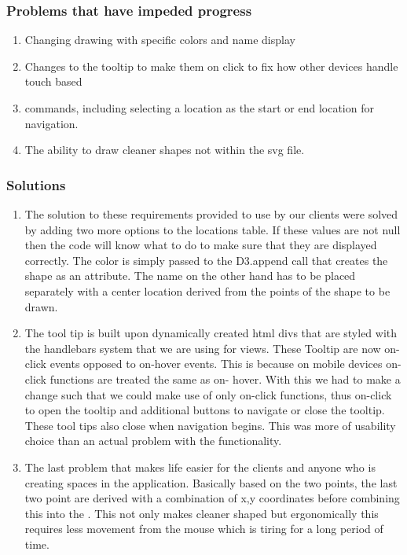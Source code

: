 \documentclass[letterpaper,10pt,serif,titlepage, onecolumn, compsoc]{IEEEtran}
\begin{document}
\subsubsection{Problems that have impeded progress}
\begin{enumerate}
\item Changing drawing with specific colors and name display
\item Changes to the tooltip to make them on click to fix how other devices handle touch based \item 	commands, including selecting a location as the start or end location for navigation.
\item The ability to draw cleaner shapes not within the svg file.
\end{enumerate}

\subsubsection{Solutions}
\begin{enumerate}
\item The solution to these requirements provided to use by our clients were solved by adding two more options to the locations table. If these values are not null then the code will know what to do to make sure that they are displayed correctly. The color is simply passed to the D3.append call that creates the shape as an attribute. The name on the other hand has to be placed separately with a center location derived from the points of the shape to be drawn.
\item The tool tip is built upon dynamically created html divs that are styled with the handlebars system that we are using for views. These Tooltip are now on-click events opposed to  on-hover events. This is because on mobile devices on-click functions are treated  the same as on- hover. With this we had to make a change such that we could make use of only on-click functions, thus on-click to open the tooltip and additional buttons to navigate or close the tooltip. These tool tips also close when navigation begins. This was more of usability choice than an actual problem with the functionality.
\item The last problem that makes life easier for the clients and anyone who is creating spaces in the application. Basically based on the two points, the last two point are derived with a combination of x,y coordinates before combining this into the . This not only makes cleaner shaped but ergonomically this requires less movement from the mouse which is tiring for a long period of time.
\end{enumerate}
\end{document}

